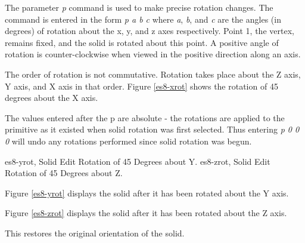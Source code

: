 
The parameter {\em p} command is used to make precise rotation changes.
The
command is entered in the form {\em p a b c} where
{\em a}, {\em b}, and {\em c} are the angles
(in degrees) of rotation about the x, y, and z axes respectively.  Point 1,
the vertex, remains fixed, and the solid is rotated about this point.  A
positive angle of rotation is counter-clockwise when viewed in the positive
direction along an axis.

The order of rotation is not commutative.
Rotation takes place about the
Z axis, Y axis, and X axis in that order.
Figure \ref{es8-xrot} shows the rotation of 45 degrees about the X axis.


The values entered after the p are absolute - the rotations are applied to
the primitive as it existed when solid rotation was first selected.  Thus 
entering {\em p 0 0 0} will undo any rotations
performed since solid rotation was begun.

\mfig es8-yrot, Solid Edit Rotation of 45 Degrees about Y.
\mfig es8-zrot, Solid Edit Rotation of 45 Degrees about Z.


Figure \ref{es8-yrot} displays the solid
after it has been rotated about the Y axis.


Figure \ref{es8-zrot} displays the solid
after it has been rotated about the Z axis.


This restores the original orientation of the solid.

